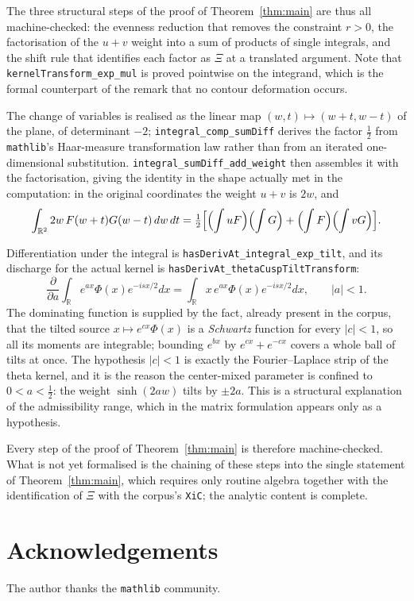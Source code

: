 \documentclass[11pt,a4paper]{amsart}
\theoremstyle{plain}
\theoremstyle{definition}
\newcommand{\RR}{\mathbb{R}}
\newcommand{\Xii}{\Xi}
\newcommand{\Lean}[1]{\texttt{\small #1}}
\begin{document}
The three structural steps of the proof of Theorem~\ref{thm:main} are thus all machine-checked: the
evenness reduction that removes the constraint $r>0$, the factorisation of the $u+v$ weight into a
sum of products of single integrals, and the shift rule that identifies each factor as $\Xii$ at a
translated argument.  Note that \Lean{kernelTransform\_exp\_mul} is proved pointwise on the
integrand, which is the formal counterpart of the remark that no contour deformation occurs.

The change of variables is realised as the linear map $(w,t)\mapsto(w+t,w-t)$ of the plane, of
determinant $-2$; \Lean{integral\_comp\_sumDiff} derives the factor $\tfrac12$ from
\texttt{mathlib}'s Haar-measure transformation law rather than from an iterated one-dimensional
substitution.  \Lean{integral\_sumDiff\_add\_weight} then assembles it with the factorisation,
giving the identity in the shape actually met in the computation: in the original coordinates the
weight $u+v$ is $2w$, and
\[
  \int_{\RR^2} 2w\,F(w+t)G(w-t)\,dw\,dt
  =\tfrac12\Bigl[\Bigl(\int uF\Bigr)\Bigl(\int G\Bigr)+\Bigl(\int F\Bigr)\Bigl(\int vG\Bigr)\Bigr].
\]

Differentiation under the integral is \Lean{hasDerivAt\_integral\_exp\_tilt}, and its discharge
for the actual kernel is \Lean{hasDerivAt\_thetaCuspTiltTransform}:
\[
  \frac{\partial}{\partial a}\int_\RR e^{ax}\Phi(x)e^{-isx/2}dx
  =\int_\RR x\,e^{ax}\Phi(x)e^{-isx/2}dx ,\qquad |a|<1 .
\]
The dominating function is supplied by the fact, already present in the corpus, that the tilted
source $x\mapsto e^{cx}\Phi(x)$ is a \emph{Schwartz} function for every $|c|<1$, so all its moments
are integrable; bounding $e^{bx}$ by $e^{cx}+e^{-cx}$ covers a whole ball of tilts at once. The
hypothesis $|c|<1$ is exactly the Fourier--Laplace strip of the theta kernel, and it is the reason
the center-mixed parameter is confined to $0<a<\tfrac12$: the weight $\sinh(2aw)$ tilts by $\pm2a$.
This is a structural explanation of the admissibility range, which in the matrix formulation appears
only as a hypothesis.

Every step of the proof of Theorem~\ref{thm:main} is therefore machine-checked. What is not yet
formalised is the chaining of these steps into the single statement of Theorem~\ref{thm:main}, which
requires only routine algebra together with the identification of $\Xii$ with the corpus's
\Lean{XiC}; the analytic content is complete.

\section*{Acknowledgements}
The author thanks the \texttt{mathlib} community.
\end{document}
